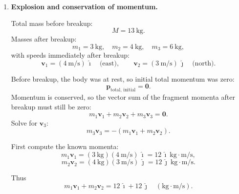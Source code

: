 \documentclass[12pt]{article}
\begin{document}
\begin{enumerate}
\begin{enumerate}
    Now evaluate the minimum distance. First compute $D^2$ at $t = 17/25$:
    \[
    D^2\!\left(\frac{17}{25}\right)
    = 25\left(\frac{17}{25}\right)^2 
    - 34\left(\frac{17}{25}\right)
    + 13.
    \]

    Compute term by term:
    \[
    \left(\frac{17}{25}\right)^2 = \frac{289}{625},
    \quad
    25 \cdot \frac{289}{625} = \frac{7225}{625} = 11.56.
    \]
    Next:
    \[
    34 \cdot \frac{17}{25} = \frac{578}{25} = 23.12.
    \]
    So
    \[
    D^2\!\left(\frac{17}{25}\right)
    = 11.56 - 23.12 + 13
    = 1.44.
    \]

    Therefore
    \[
    D_\text{min} = \sqrt{1.44} = 1.2~\text{m}.
    \]

    Summary: the two particles are closest at
    \[
    t = \frac{17}{25}~\text{s} = 0.68~\text{s},
    \qquad
    D_\text{min} = 1.2~\text{m}.
    \]

    Interpretation: since both have constant (but different) velocities, their relative motion is uniform, so the closest approach happens when the line between them is perpendicular to the relative velocity.
\end{enumerate}


\item \textbf{Explosion and conservation of momentum.}

Total mass before breakup:
\[
M = 13~\text{kg}.
\]
Masses after breakup:
\[
m_1 = 3~\text{kg}, \quad m_2 = 4~\text{kg}, \quad m_3 = 6~\text{kg},
\]
with speeds immediately after breakup:
\[
\mathbf{v}_1 = (4~\text{m/s})\,\hat{\imath} \quad \text{(east)},
\qquad
\mathbf{v}_2 = (3~\text{m/s})\,\hat{\jmath} \quad \text{(north)}.
\]

Before breakup, the body was at rest, so initial total momentum was zero:
\[
\mathbf{p}_\text{total, initial} = \mathbf{0}.
\]
Momentum is conserved, so the vector sum of the fragment momenta after breakup must still be zero:
\[
m_1 \mathbf{v}_1 + m_2 \mathbf{v}_2 + m_3 \mathbf{v}_3 = \mathbf{0}.
\]
Solve for $\mathbf{v}_3$:
\[
m_3 \mathbf{v}_3 = - \left( m_1 \mathbf{v}_1 + m_2 \mathbf{v}_2 \right).
\]

First compute the known momenta:
\[
m_1 \mathbf{v}_1 = (3~\text{kg})(4~\text{m/s})\,\hat{\imath}
= 12\,\hat{\imath}~\text{kg}\cdot\text{m/s},
\]
\[
m_2 \mathbf{v}_2 = (4~\text{kg})(3~\text{m/s})\,\hat{\jmath}
= 12\,\hat{\jmath}~\text{kg}\cdot\text{m/s}.
\]

Thus
\[
m_1 \mathbf{v}_1 + m_2 \mathbf{v}_2
= 12\,\hat{\imath} + 12\,\hat{\jmath}
\quad (\text{kg}\cdot\text{m/s}).
\]


\end{enumerate}
\end{document}

